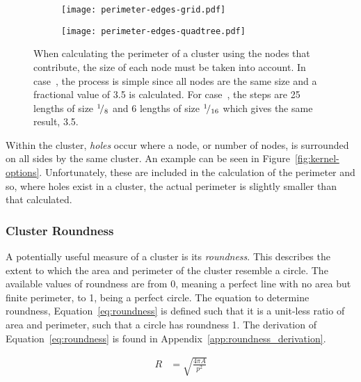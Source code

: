 \begin{figure}[tbhp]
	\centering
	\begin{subfigure}[c]{3.5cm}
		\texttt{[image: perimeter-edges-grid.pdf]}
		\caption{}\label{fig:perimeter-edges-grid.pdf}
	\end{subfigure}%
	\quad
	\begin{subfigure}[c]{3.5cm}
		\texttt{[image: perimeter-edges-quadtree.pdf]}
		\caption{}\label{fig:perimeter-edges-quadtree.pdf}
	\end{subfigure}

	\caption[Perimeter size from node edge size.]{When calculating the
		perimeter of a cluster using the nodes that contribute, the size of
		each node must be taken into account. In
		case~, the process is simple since
		all nodes are the same size and a fractional value of 3.5 is
		calculated. For case~, the
		steps are 25 lengths of size ${}^{1}\!/_{8}$ and 6 lengths of size
		${}^{1}\!/_{16}$ which gives the same result,
		3.5.}\label{fig:perimeter-edges}

\end{figure}

Within the cluster, \emph{holes} occur where a node, or number of nodes, is
surrounded on all sides by the same cluster. An example can be seen in
Figure~\ref{fig:kernel-options}. Unfortunately, these are included in the
calculation of the perimeter and so, where holes exist in a cluster, the actual
perimeter is slightly smaller than that calculated.

\subsubsection{Cluster Roundness}
\label{ssub:Cluster_Roundness}

A potentially useful measure of a cluster is its \emph{roundness}. This
describes the extent to which the area and perimeter of the cluster resemble a
circle. The available values of roundness are from 0, meaning a perfect line
with no area but finite perimeter, to 1, being a perfect circle. The equation
to determine roundness, Equation~\ref{eq:roundness} is defined such that it is
a unit-less ratio of area and perimeter, such that a circle has roundness 1.
The derivation of Equation~\ref{eq:roundness} is found in
Appendix~\ref{app:roundness_derivation}.

\begin{align}
	R &= \sqrt{\frac{4\pi A}{p^2}} \label{eq:roundness}
\end{align}

